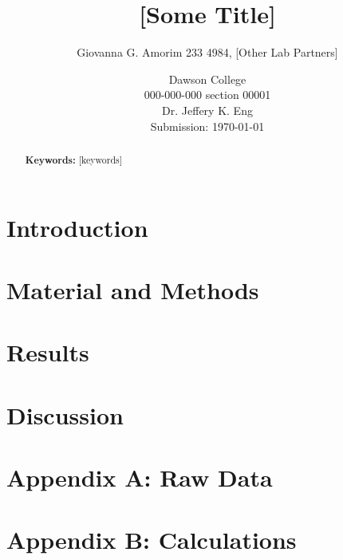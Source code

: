 \documentclass[letterpaper]{article}
\title{[Some Title]}
\author{Giovanna G. Amorim 233 4984, [Other Lab Partners]}
\date{Dawson College \\[15pt]
000-000-000 section 00001\\[15pt]
Dr. Jeffery K. Eng\\[15pt]
Submission: \today}
\begin{document}
\maketitle

\begin{abstract}
        
	\noindent\textbf{Keywords:} [keywords]
\end{abstract}

\tableofcontents

\newpage

\section{Introduction}
\label{sec:introduction}

\section{Material and Methods}
\label{sec:matandmet}

\section{Results}
\label{sec:results}

\section{Discussion}
\label{sec:discussion}

\printbibliography[heading=bibintoc]

\section*{Appendix A: Raw Data}
\label{sec:appendixa}

\section*{Appendix B: Calculations}
\label{sec:appendixb}
\end{document}
